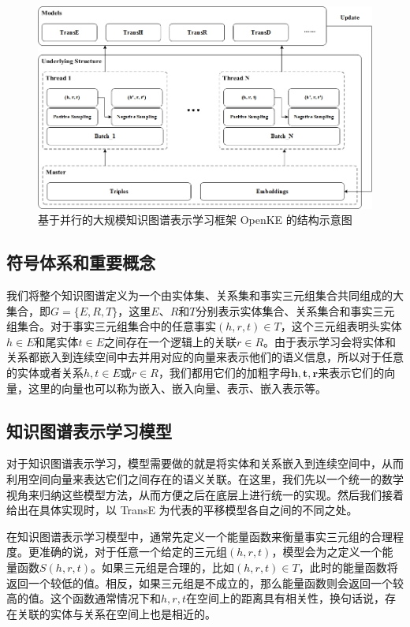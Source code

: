 \begin{figure}[h]
\centering
\includegraphics[width=1.0\linewidth]{figures/ch2/3.jpg}
\caption{基于并行的大规模知识图谱表示学习框架 OpenKE 的结构示意图}
\label{fig2:openke}
\end{figure}

\subsection{符号体系和重要概念}

我们将整个知识图谱定义为一个由实体集、关系集和事实三元组集合共同组成的大集合，即$G = \{E, R, T\}$，这里$E$、$R$和$T$分别表示实体集合、关系集合和事实三元组集合。对于事实三元组集合中的任意事实$(h, r, t) \in T$，这个三元组表明头实体$h \in E$和尾实体$t \in E$之间存在一个逻辑上的关联$r \in R$。由于表示学习会将实体和关系都嵌入到连续空间中去并用对应的向量来表示他们的语义信息，所以对于任意的实体或者关系$h, t \in E$或$r \in R$，我们都用它们的加粗字母$\mathbf{h}, \mathbf{t}, \mathbf{r}$来表示它们的向量，这里的向量也可以称为嵌入、嵌入向量、表示、嵌入表示等。

\subsection{知识图谱表示学习模型}
\label{ch2:knowledgemodels}

对于知识图谱表示学习，模型需要做的就是将实体和关系嵌入到连续空间中，从而利用空间向量来表达它们之间存在的语义关联。在这里，我们先以一个统一的数学视角来归纳这些模型方法，从而方便之后在底层上进行统一的实现。然后我们接着给出在具体实现时，以 TransE 为代表的平移模型各自之间的不同之处。

在知识图谱表示学习模型中，通常先定义一个能量函数来衡量事实三元组的合理程度。更准确的说，对于任意一个给定的三元组$(h, r, t)$，模型会为之定义一个能量函数$S(h, r, t)$。如果三元组是合理的，比如$(h, r, t)\in T$，此时的能量函数将返回一个较低的值。相反，如果三元组是不成立的，那么能量函数则会返回一个较高的值。这个函数通常情况下和$h, r, t$在空间上的距离具有相关性，换句话说，存在关联的实体与关系在空间上也是相近的。

